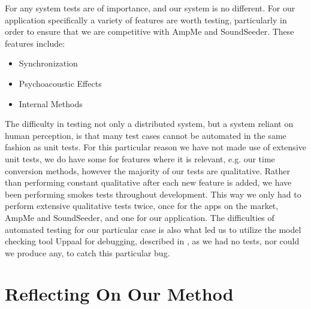 \bigskip
For any system tests are of importance, and our system is no different.
For our application specifically a variety of features are worth testing, particularly in order to ensure that we are competitive with AmpMe and SoundSeeder.
These features include:
\begin{itemize}
    \item Synchronization
    \item Psychoacoustic Effects
    \item Internal Methods
\end{itemize}
The difficulty in testing not only a distributed system, but a system reliant on human perception, is that many test cases cannot be automated in the same fashion as unit tests.
For this particular reason we have not made use of extensive unit tests, we do have some for features where it is relevant, e.g. our time conversion methods, however the majority of our tests are qualitative.
Rather than performing constant qualitative after each new feature is added, we have been performing smokes tests throughout development.
This way we only had to perform extensive qualitative tests twice, once for the apps on the market, AmpMe and SoundSeeder, and one for our application.
The difficulties of automated testing for our particular case is also what led us to utilize the model checking tool Uppaal for debugging, described in , as we had no tests, nor could we produce any, to catch this particular bug.

\section{Reflecting On Our Method}





